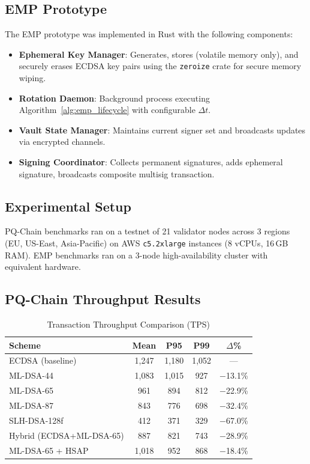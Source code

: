 \documentclass[12pt, a4paper, twocolumn]{article}
\begin{document}
\subsection{EMP Prototype}

The EMP prototype was implemented in Rust with the following components:

\begin{itemize}[noitemsep]
  \item \textbf{Ephemeral Key Manager}: Generates, stores (volatile memory only), and securely erases ECDSA key pairs using the \texttt{zeroize} crate for secure memory wiping.
  \item \textbf{Rotation Daemon}: Background process executing Algorithm~\ref{alg:emp_lifecycle} with configurable $\Delta t$.
  \item \textbf{Vault State Manager}: Maintains current signer set and broadcasts updates via encrypted channels.
  \item \textbf{Signing Coordinator}: Collects permanent signatures, adds ephemeral signature, broadcasts composite multisig transaction.
\end{itemize}

\subsection{Experimental Setup}

PQ-Chain benchmarks ran on a testnet of 21 validator nodes across 3 regions (EU, US-East, Asia-Pacific) on AWS \texttt{c5.2xlarge} instances (8 vCPUs, 16\,GB RAM). EMP benchmarks ran on a 3-node high-availability cluster with equivalent hardware.

\subsection{PQ-Chain Throughput Results}

\begin{table}[H]
\centering
\caption{Transaction Throughput Comparison (TPS)}
\label{tab:throughput}
\begin{tabular}{lcccc}
\toprule
\textbf{Scheme} & \textbf{Mean} & \textbf{P95} & \textbf{P99} & \textbf{$\Delta$\%}\\
\midrule
ECDSA (baseline)          & 1,247 & 1,180 & 1,052 & ---   \\
ML-DSA-44                 & 1,083 & 1,015 &   927 & $-$13.1\% \\
ML-DSA-65                 &   961 &   894 &   812 & $-$22.9\% \\
ML-DSA-87                 &   843 &   776 &   698 & $-$32.4\% \\
SLH-DSA-128f              &   412 &   371 &   329 & $-$67.0\% \\
Hybrid (ECDSA+ML-DSA-65)  &   887 &   821 &   743 & $-$28.9\% \\
ML-DSA-65 + HSAP          & 1,018 &   952 &   868 & $-$18.4\% \\
\bottomrule
\end{tabular}
\end{table}
\end{document}
